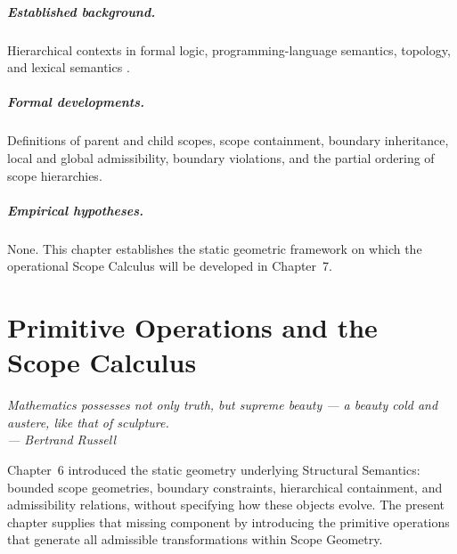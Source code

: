 \documentclass[11pt,twoside,openright]{book}
\numberwithin{equation}{chapter}
\theoremstyle{definition}
\theoremstyle{plain}
\theoremstyle{remark}
\theoremstyle{definition}
\begin{document}
\paragraph{Established background.} Hierarchical contexts in formal
logic, programming-language semantics, topology, and lexical semantics
\cite{Gentzen1935,Pierce2002,Lyons1977,MacLane1998}.

\paragraph{Formal developments.} Definitions of parent and child scopes,
scope containment, boundary inheritance, local and global admissibility,
boundary violations, and the partial ordering of scope hierarchies.

\paragraph{Empirical hypotheses.} None. This chapter establishes the
static geometric framework on which the operational Scope Calculus will
be developed in Chapter~7.

\chapter{Primitive Operations and the Scope Calculus}
\label{ch:scope-calculus}

\vspace{1em}
\begin{flushright}\itshape
Mathematics possesses not only truth, but supreme beauty --- a beauty cold
and austere, like that of sculpture.\\
\upshape --- Bertrand Russell
\end{flushright}
\vspace{1em}

Chapter~6 introduced the static geometry underlying Structural Semantics:
bounded scope geometries, boundary constraints, hierarchical containment,
and admissibility relations, without specifying how these objects evolve.
The present chapter supplies that missing component by introducing the
primitive operations that generate all admissible transformations within
Scope Geometry.
\end{document}
